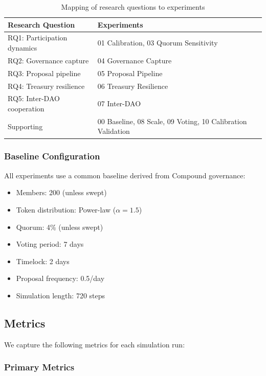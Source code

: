 \begin{table}[htbp]
\centering
\caption{Mapping of research questions to experiments}
\label{tab:rq-mapping}
\begin{tabular}{@{}ll@{}}
\toprule
Research Question & Experiments \\
\midrule
RQ1: Participation dynamics & 01 Calibration, 03 Quorum Sensitivity \\
RQ2: Governance capture & 04 Governance Capture \\
RQ3: Proposal pipeline & 05 Proposal Pipeline \\
RQ4: Treasury resilience & 06 Treasury Resilience \\
RQ5: Inter-DAO cooperation & 07 Inter-DAO \\
Supporting & 00 Baseline, 08 Scale, 09 Voting, 10 Calibration Validation \\
\bottomrule
\end{tabular}
\end{table}

\subsubsection{Baseline Configuration}

All experiments use a common baseline derived from Compound governance:

\begin{itemize}
    \item Members: 200 (unless swept)
    \item Token distribution: Power-law ($\alpha = 1.5$)
    \item Quorum: 4\% (unless swept)
    \item Voting period: 7 days
    \item Timelock: 2 days
    \item Proposal frequency: 0.5/day
    \item Simulation length: 720 steps
\end{itemize}

\subsection{Metrics}

We capture the following metrics for each simulation run:

\subsubsection{Primary Metrics}

